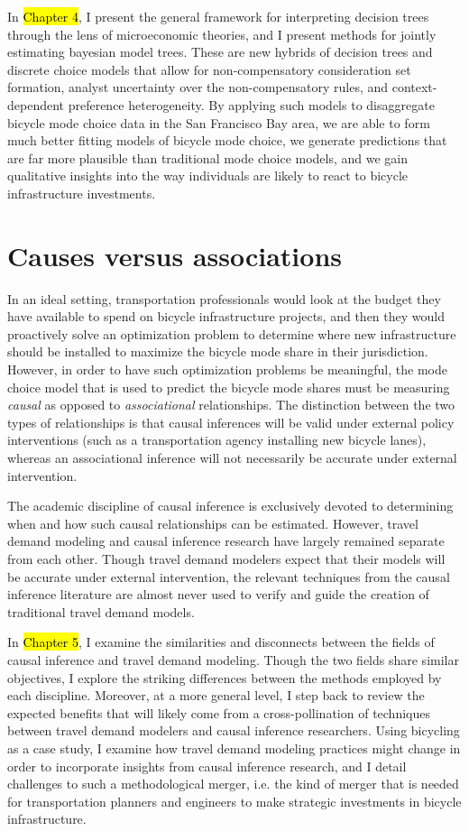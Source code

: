 \documentclass{article}
\begin{document}
In \hl{Chapter 4}, I present the general framework for interpreting decision trees through the lens of microeconomic theories, and I present methods for jointly estimating bayesian model trees. These are new hybrids of decision trees and discrete choice models that allow for non-compensatory consideration set formation, analyst uncertainty over the non-compensatory rules, and context-dependent preference heterogeneity. By applying such models to disaggregate bicycle mode choice data in the San Francisco Bay area, we are able to form much better fitting models of bicycle mode choice, we generate predictions that are far more plausible than traditional mode choice models, and we gain qualitative insights into the way individuals are likely to react to bicycle infrastructure investments.


\section{Causes versus associations}
\label{sec:causal-biking}
In an ideal setting, transportation professionals would look at the budget they have available to spend on bicycle infrastructure projects, and then they would proactively solve an optimization problem to determine where new infrastructure should be installed to maximize the bicycle mode share in their jurisdiction. However, in order to have such optimization problems be meaningful, the mode choice model that is used to predict the bicycle mode shares must be measuring \textit{causal} as opposed to \textit{associational} relationships. The distinction between the two types of relationships is that causal inferences will be valid under external policy interventions (such as a transportation agency installing new bicycle lanes), whereas an associational inference will not necessarily be accurate under external intervention.

The academic discipline of causal inference is exclusively devoted to determining when and how such causal relationships can be estimated. However, travel demand modeling and causal inference research have largely remained separate from each other. Though travel demand modelers expect that their models will be accurate under external intervention, the relevant techniques from the causal inference literature are almost never used to verify and guide the creation of traditional travel demand models.

In \hl{Chapter 5}, I examine the similarities and disconnects between the fields of causal inference and travel demand modeling. Though the two fields share similar objectives, I explore the striking differences between the methods employed by each discipline. Moreover, at a more general level, I step back to review the expected benefits that will likely come from a cross-pollination of techniques between travel demand modelers and causal inference researchers. Using bicycling as a case study, I examine how travel demand modeling practices might change in order to incorporate insights from causal inference research, and I detail challenges to such a methodological merger, i.e. the kind of merger that is needed for transportation planners and engineers to make strategic investments in bicycle infrastructure.
\end{document}
